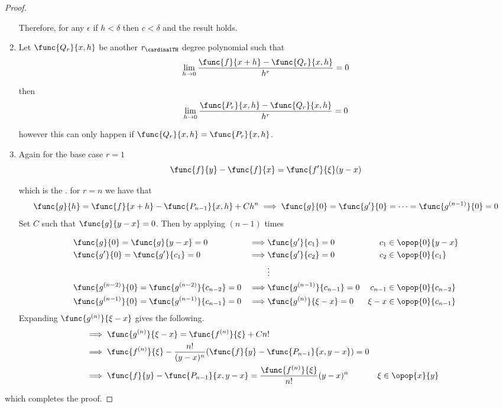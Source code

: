 \begin{proof}
\begin{enumerate}
          Therefore, for any \(\epsilon\) if \(h < \delta\) then \(c < \delta\) and the result holds.
    \item
          Let \(\func{Q_r}{x,h}\) be another \(r_{\cardinalTH}\) degree polynomial such that
          \begin{equation*}
              \lim_{h \to 0}{\dfrac{\func{f}{x+h} -\func{Q_r}{x,h}}{h^r}} = 0
          \end{equation*}

          then
          \begin{equation*}
              \lim_{h \to 0}{\dfrac{\func{P_r}{x,h} -\func{Q_r}{x,h}}{h^r}} = 0
          \end{equation*}

          however this can only happen if \(\func{Q_r}{x,h} = \func{P_r}{x,h}\).
    \item
          Again for the base case \(r = 1\)
          \begin{equation*}
              \func{f}{y} - \func{f}{x} = \func{f'}{\xi}(y-x)
          \end{equation*}

          which is the . for \(r = n\) we have that
          \begin{equation*}
              \func{g}{h} = \func{f}{x+h} - \func{P_{n-1}}{x,h} + Ch^n \implies \func{g}{0} = \func{g'}{0} = \dots = \func{g^{(n-1)}}{0} =0
          \end{equation*}
          Set \(C\) such that \(\func{g}{y-x} = 0\). Then by applying  \((n-1)\) times

          \begin{align*}
              &\func{g}{0} = \func{g}{y-x} = 0 &\implies& \func{g'}{c_1} = 0 & c_1 &\in \opop{0}{y-x} \\
              &\func{g'}{0} = \func{g'}{c_1} = 0& \implies& \func{g'}{c_2} = 0 &c_2 &\in \opop{0}{c_1}\\
              && &\vdots &&\\
              & \func{g^{(n-2)}}{0} = \func{g^{(n-2)}}{c_{n-2}} = 0 &\implies& \func{g^{(n-1)}}{c_{n-1}} = 0 & c_{n-1} &\in \opop{0}{c_{n-2}}\\
              &\func{g^{(n-1)}}{0} = \func{g^{(n-1)}}{c_{n-1}} = 0 &\implies& \func{g^{(n)}}{\xi - x} = 0 & \xi - x &\in \opop{0}{c_{n-1}} 
          \end{align*}
          Expanding \(\func{g^{(n)}}{\xi - x}\) gives the following.
          \begin{align*}
              &\implies  \func{g^{(n)}}{\xi - x} =  \func{f^{(n)}}{\xi} + Cn! \\
              &\implies \func{f^{(n)}}{\xi} - \dfrac{n!}{(y-x)^n}(\func{f}{y} - \func{P_{n-1}}{x,y-x} ) = 0 \\
              &\implies \func{f}{y} - \func{P_{n-1}}{x,y-x}  =  \dfrac{\func{f^{(n)}}{\xi}}{n!}(y-x)^n & \xi &\in \opop{x}{y}
          \end{align*}
 \end{enumerate}
 which completes the proof.
\end{proof}

